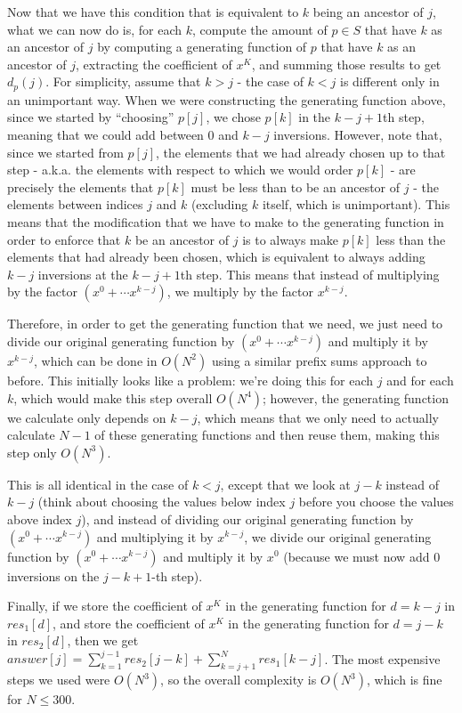 \documentclass{article}
\begin{document}
Now that we have this condition that is equivalent to $k$ being an ancestor of $j$, what we can now do is, for each $k$, compute the amount of $p\in S$ that have $k$ as an ancestor of $j$ by computing a generating function of $p$ that have $k$ as an ancestor of $j$, extracting the coefficient of $x^K$, and summing those results to get $d_p(j)$. For simplicity, assume that $k > j$ - the case of $k < j$ is different only in an unimportant way. When we were constructing the generating function above, since we started by “choosing” $p[j]$, we chose $p[k]$ in the $k - j + 1$th step, meaning that we could add between $0$ and $k - j$ inversions. However, note that, since we started from $p[j]$, the elements that we had already chosen up to that step - a.k.a. the elements with respect to which we would order $p[k]$ - are precisely the elements that $p[k]$ must be less than to be an ancestor of $j$ - the elements between indices $j$ and $k$ (excluding $k$ itself, which is unimportant). This means that the modification that we have to make to the generating function in order to enforce that $k$ be an ancestor of $j$ is to always make $p[k]$ less than the elements that had already been chosen, which is equivalent to always adding $k - j$ inversions at the $k - j + 1$th step. This means that instead of multiplying by the factor $(x^0 + \cdots x^{k - j})$, we multiply by the factor $x^{k  - j}$.

Therefore, in order to get the generating function that we need, we just need to divide our original generating function by $(x^0 + \cdots x^{k - j})$ and multiply it by $x^{k - j}$, which can be done in $O(N^2)$ using a similar prefix sums approach to before. This initially looks like a problem: we’re doing this for each $j$ and for each $k$, which would make this step overall $O(N^4)$; however, the generating function we calculate only depends on $k - j$, which means that we only need to actually calculate $N - 1$ of these generating functions and then reuse them, making this step only $O(N^3)$.

This is all identical in the case of $k < j$, except that we look at $j - k$ instead of $k - j$ (think about choosing the values below index $j$ before you choose the values above index $j$), and instead of dividing our original generating function by $(x^0 + \cdots x^{k - j})$ and multiplying it by $x^{k - j}$, we divide our original generating function by $(x^0 + \cdots x^{k - j})$ and multiply it by $x^0$ (because we must now add $0$ inversions on the $j - k + 1$-th step).

Finally, if we store the coefficient of $x^K$ in the generating function for $d = k - j$ in $res_1[d]$, and store the coefficient of $x^K$ in the generating function for $d = j - k$ in $res_2[d]$, then we get $answer[j] = \sum_{k = 1}^{j - 1}res_2[j - k] + \sum_{k = j + 1}^{N}res_1[k - j]$. The most expensive steps we used were $O(N^3)$, so the overall complexity is $O(N^3)$, which is fine for $N \leq 300$.
\end{document}
